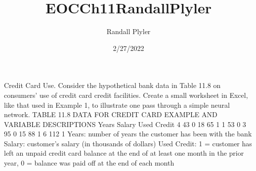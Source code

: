 \documentclass[
]{article}
\title{EOCCh11RandallPlyler}
\author{Randall Plyler}
\date{2/27/2022}
\newenvironment{Shaded}{\begin{snugshade}}{\end{snugshade}}
\newcommand{\AttributeTok}[1]{\textcolor[rgb]{0.77,0.63,0.00}{#1}}
\newcommand{\DecValTok}[1]{\textcolor[rgb]{0.00,0.00,0.81}{#1}}
\newcommand{\FunctionTok}[1]{\textcolor[rgb]{0.00,0.00,0.00}{#1}}
\newcommand{\NormalTok}[1]{#1}
\newcommand{\OtherTok}[1]{\textcolor[rgb]{0.56,0.35,0.01}{#1}}
\newcommand{\SpecialCharTok}[1]{\textcolor[rgb]{0.00,0.00,0.00}{#1}}
\begin{document}
\maketitle

Credit Card Use. Consider the hypothetical bank data in Table 11.8 on
consumers' use of credit card credit facilities. Create a small
worksheet in Excel, like that used in Example 1, to illustrate one pass
through a simple neural network. TABLE 11.8 DATA FOR CREDIT CARD EXAMPLE
AND VARIABLE DESCRIPTIONS Years Salary Used Credit 4 43 0 18 65 1 1 53 0
3 95 0 15 88 1 6 112 1 Years: number of years the customer has been with
the bank Salary: customer's salary (in thousands of dollars) Used
Credit: 1 = customer has left an unpaid credit card balance at the end
of at least one month in the prior year, 0 = balance was paid off at the
end of each month

\begin{Shaded}
\end{Shaded}
\end{document}

